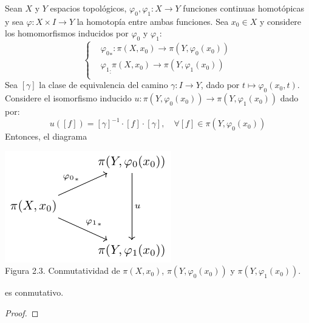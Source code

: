 \documentclass[12pt]{report}
\theoremstyle{largebreak}
\newcommand\cf[3]{\ensuremath{#1:#2\rightarrow#3}}
\begin{document}
    \begin{theor}
        Sean $X$ y $Y$ espacios topológicos, $\cf{\varphi_0,\varphi_1}{X}{Y}$ funciones continuas homotópicas y sea $\cf{\varphi}{X\times I}{Y}$ la homotopía entre ambas funciones. Sea $x_0\in X$ y considere los homomorfismos inducidos por $\varphi_0$ y $\varphi_1$:
        \begin{equation*}
            \left\{
            \begin{split}
                &\cf{{\varphi_0}_*}{\pi(X,x_0)}{\pi(Y,\varphi_0(x_0))}\\
                &\cf{{\varphi_1}_ }{\pi(X,x_0)}{\pi(Y,\varphi_1(x_0))}\\
            \end{split}
            \right.
        \end{equation*}
        Sea $[\gamma]$ la clase de equivalencia del camino $\cf{\gamma}{I}{Y}$, dado por $t\mapsto\varphi_0(x_0,t)$. Considere el isomorfismo inducido $\cf{u}{\pi(Y,\varphi_0(x_0))}{\pi(Y,\varphi_1(x_0))}$ dado por:
        \begin{equation*}
            u([f])=[\gamma]^{-1}\cdot[f]\cdot[\gamma],\quad\forall [f]\in\pi(Y,\varphi_0(x_0))
        \end{equation*}
        Entonces, el diagrama

        \begin{minipage}{\textwidth}
            \begin{center}
                \includegraphics[scale=1.5]{images/fig_4.pdf}\\
                Figura 2.3. Conmutatividad de $\pi(X,x_0)$, $\pi(Y,\varphi_0(x_0))$ y $\pi(Y,\varphi_1(x_0))$.
            \end{center}
        \end{minipage}

        es conmutativo.
    \end{theor}

    \begin{proof}
    \end{proof}
\end{document}
